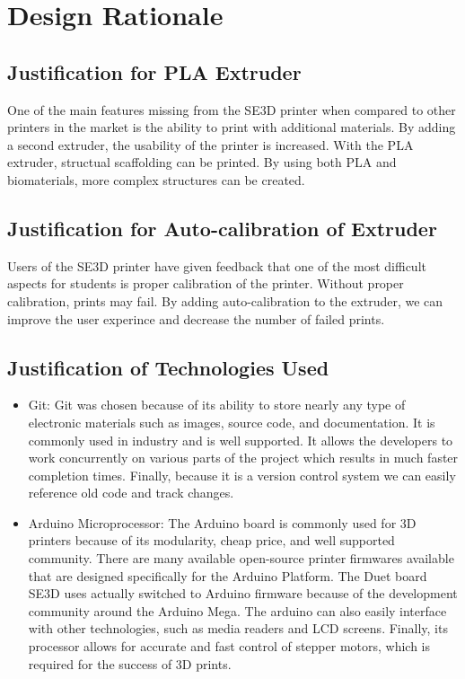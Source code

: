 \section{Design Rationale}

\subsection{Justification for PLA Extruder}
	One of the main features missing from the SE3D printer when compared to other printers in the market is the ability to print with additional materials. By adding a second extruder, the usability of the printer is increased. With the PLA extruder, structual scaffolding can be printed. By using both PLA and biomaterials, more complex structures can be created.

\subsection{Justification for Auto-calibration of Extruder }
	Users of the SE3D printer have given feedback that one of the most difficult aspects for students is proper calibration of the printer. Without proper calibration, prints may fail. By adding auto-calibration to the extruder, we can improve the user experince and decrease the number of failed prints.

\subsection{Justification of Technologies Used}
\begin{itemize}
\item Git: Git was chosen because of its ability to store nearly any type of electronic materials such as images, source code, and documentation. It is commonly used in industry and is well supported. It allows the developers to work concurrently on various parts of the project which results in much faster completion times. Finally, because it is a version control system we can easily reference old code and track changes.

\item Arduino Microprocessor: The Arduino board is commonly used for 3D printers because of its modularity, cheap price, and well supported community. There are many available open-source printer firmwares available that are designed specifically for the Arduino Platform. The Duet board SE3D uses actually switched to Arduino firmware because of the development community around the Arduino Mega. The arduino can also easily interface with other technologies, such as media readers and LCD screens. Finally, its processor allows for accurate and fast control of stepper motors, which is required for the success of 3D prints.

\end{itemize}
